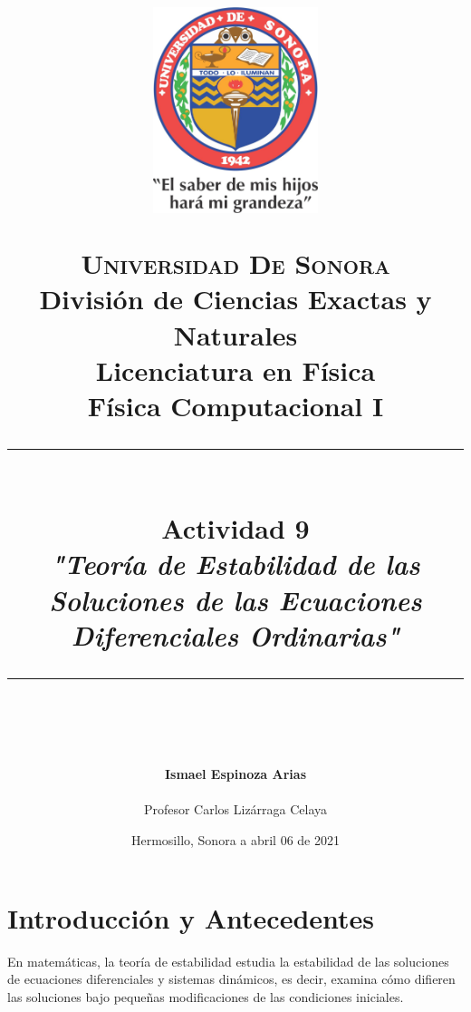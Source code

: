 \documentclass[12pt]{article}
\newcommand{\HRule}[1]{\rule{\linewidth}{#1}}
\begin{document}
\begin{titlepage}

\title{ \normalsize 
        \begin{center}
        \includegraphics[height=6cm]{Logo.jpg}
        \end{center}
        \LARGE \textsc{\textbf{Universidad De Sonora}} \\ \bigskip
		\Large División de Ciencias Exactas y Naturales \\
        Licenciatura en Física \\ \bigskip
        \bigskip
        Física Computacional I
		\\ [0.1cm]  
		\HRule{2pt} \\
		\Large \textbf{{Actividad 9}} \\
        \textit{\textbf{"Teoría de Estabilidad de las Soluciones de las Ecuaciones Diferenciales Ordinarias"}}
		\HRule{2pt} \\
		\normalsize \vspace*{0.001\baselineskip}}
        
\date{\bigskip \Large  \hspace*{\fill} Hermosillo, Sonora a abril 06 de 2021}

        
\author{
		\Large\textbf{Ismael Espinoza Arias} \\ \bigskip
        \\ \bigskip
       \Large Profesor Carlos Lizárraga Celaya}
       \end{titlepage}
       \maketitle
       
       


\section*{Introducción y Antecedentes}
En matemáticas, la teoría de estabilidad estudia la estabilidad de las soluciones de ecuaciones diferenciales y sistemas dinámicos, es decir, examina cómo difieren las soluciones bajo pequeñas modificaciones de las condiciones iniciales.\\
\end{document}
